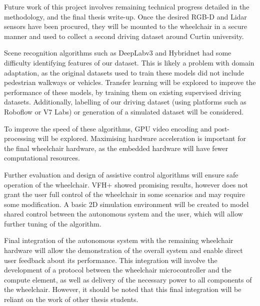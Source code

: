 Future work of this project involves remaining technical progress detailed in the methodology,
and the final thesis write-up.
Once the desired RGB-D and Lidar sensors have been procured, they will be mounted to the wheelchair
in a secure manner and used to collect a second driving dataset around Curtin university.

Scene recognition algorithms such as DeepLabv3 and Hybridnet
had some difficulty identifying features of our dataset. This is likely a problem with domain adaptation,
as the original datasets used to train these models did not include pedestrian walkways or vehicles.
Transfer learning will be explored to improve the performance of these
models, by training them on existing supervised driving datasets.
Additionally, labelling of our driving dataset (using platforms such as Roboflow or V7 Labs)
or generation of a simulated dataset will be considered.

To improve the speed of these algorithms, GPU video encoding and post-processing will be explored.
Maximising hardware acceleration is important for the final wheelchair hardware, as the embedded hardware will have fewer
computational resources.

Further evaluation and design of assistive control algorithms will ensure safe operation of the wheelchair.
VFH+ showed promising results, however does not grant the user full control of the wheelchair
in some scenarios and may require some modification. A basic 2D simulation environment will be created
to model shared control between the autonomous system and the user, which will allow further tuning
of the algorithm.

Final integration of the autonomous system with the remaining wheelchair hardware
will allow the demonstration of the overall system and enable direct user feedback about its performance.
This integration will involve the development of a protocol between the wheelchair microcontroller and the compute
element, as well as delivery of the necessary power to all components of the wheelchair.
However, it should be noted that this final integration will be reliant on the work of other thesis students.

